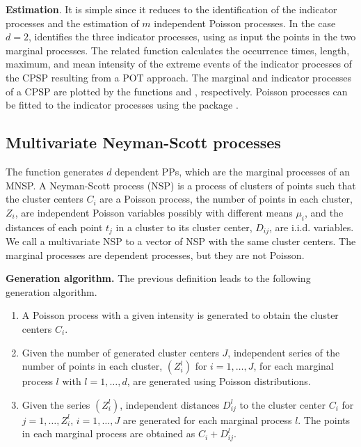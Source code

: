 \textbf{Estimation}. It is simple since it  reduces to  the identification of the indicator processes and the estimation  of  $m$ independent Poisson processes.  In the case $d=2$,   identifies the three indicator processes, using as input  the points in the two marginal processes.  The related function  calculates the occurrence times, length, maximum, and mean intensity of the extreme events of the  indicator processes of the CPSP resulting from a  POT approach.  The marginal and indicator processes of a CPSP  are plotted by the functions  and  , respectively.   Poisson processes can be fitted  to the  indicator processes  using the  package .



\subsection{Multivariate Neyman-Scott  processes}

\label{SecMNS}	
The function  generates $d$  dependent PPs, which are the marginal processes of an  MNSP.	 A Neyman-Scott process (NSP) is a process of clusters of points  such that  the cluster centers $C_i$ are a Poisson process, the number  of points in each cluster, $Z_i$, are independent Poisson variables possibly with different means $\mu_{i}$, and the distances of each point $t_j$ in a cluster to its cluster center, $D_{ij}$,  are i.i.d.  variables. 	We call a multivariate NSP to a  vector of NSP with the same cluster centers. The marginal processes  are dependent processes,  but they are not Poisson.

\textbf{Generation algorithm.} 
The previous definition leads to the following  generation algorithm.

\begin{enumerate}
	
	\item  A   Poisson process with  a given intensity is generated to obtain the cluster centers $C_i$.
	
	\item   Given the number of generated cluster  centers  $J$,  independent series of the number  of points in each cluster, $(Z_i^l)$ for $i=1,\ldots, J$,  for each marginal process $l$   with $l=1,\ldots, d$, are generated using Poisson distributions.
	
	\item Given the series $(Z_i^l)$, independent  distances  $D_{ij}^l$ to the cluster center $C_i$  for  $j=1,\ldots, Z_i^l$, $i=1,\ldots, J$ are generated   for each marginal process  $l$. The points in each marginal process are obtained as $C_i+D_{ij}^l$.
	
\end{enumerate}


